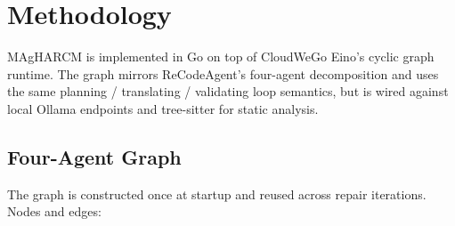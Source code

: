 \section{Methodology}
\label{sec:method}

MAgHARCM is implemented in Go on top of CloudWeGo Eino's cyclic graph
runtime. The graph mirrors ReCodeAgent's four-agent decomposition
\citep{ibrahimzada2025recodeagent} and uses the same planning / translating
/ validating loop semantics, but is wired against local Ollama endpoints
and tree-sitter for static analysis.

\subsection{Four-Agent Graph}

The graph is constructed once at startup and reused across repair
iterations. Nodes and edges:

